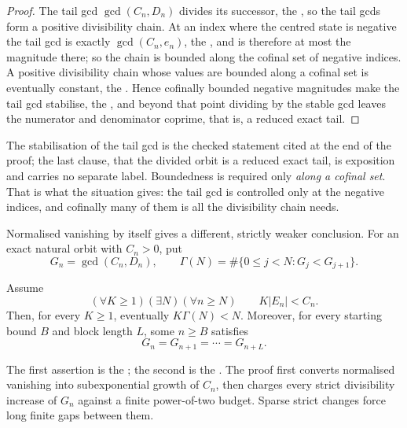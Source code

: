 \begin{proof}
The tail gcd $\gcd(C_n,D_n)$ divides its successor, the
, so the tail gcds form a positive divisibility chain.  At an
index where the centred state is negative the tail gcd is exactly
$\gcd(C_n,e_n)$, the
, and is therefore at most the magnitude there; so the
chain is bounded along the cofinal set of negative indices.  A positive
divisibility chain whose values are bounded along a cofinal set is eventually
constant, the
.  Hence cofinally bounded negative magnitudes make the tail gcd
stabilise, the
, and beyond that point dividing by the stable gcd leaves the
numerator and denominator coprime, that is, a reduced exact tail.
\end{proof}

\noindent The stabilisation of the tail gcd is the checked statement cited at
the end of the proof; the last clause, that the divided orbit is a reduced
exact tail, is exposition and carries no separate label.  Boundedness is
required only \emph{along a cofinal set}.  That is what the situation gives:
the tail gcd is
controlled only at the negative indices, and cofinally many of them is all the
divisibility chain needs.

Normalised vanishing by itself gives a different, strictly weaker conclusion.
For an exact natural orbit with $C_n>0$, put
\[
 G_n=\gcd(C_n,D_n),\qquad
 \Gamma(N)=\#\{0\le j<N:G_j<G_{j+1}\}.
\]

\begin{proposition}
\label{res:gcdsparse}
Assume
\[
  (\forall K\ge1)(\exists N)(\forall n\ge N)\qquad
  K|E_n|<C_n.
\]
Then, for every $K\ge1$, eventually $K\Gamma(N)<N$.  Moreover, for every
starting bound $B$ and block length $L$, some $n\ge B$ satisfies
\[
  G_n=G_{n+1}=\cdots=G_{n+L}.
\]
\end{proposition}

\noindent The first assertion is the
; the second is the
.  The proof first converts normalised vanishing
into subexponential growth of $C_n$, then charges every strict divisibility
increase of $G_n$ against a finite power-of-two budget.  Sparse strict changes
force long finite gaps between them.

